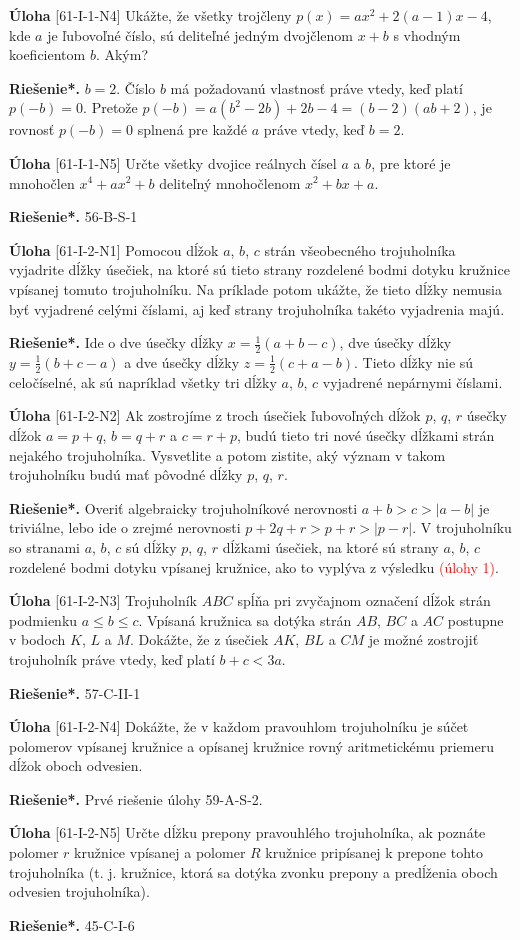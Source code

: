 \documentclass{article}
\newcommand{\rieh}{\textbf{Riešenie*.} }
\newcommand\todo[1]{\noindent\textcolor{red}{(#1)}}
\newcommand{\problem}[4]{
  \begin{tcolorbox}[breakable,notitle,boxrule=0pt,colback=light-gray,colframe=light-gray]
    \textbf{Úloha}
    [#1] #3
  \end{tcolorbox}
  \noindent#4
}
\begin{document}
\problem{61-I-1-N4}{}{
Ukážte, že všetky trojčleny $p(x) = ax^2+ 2(a - 1)x - 4$, kde $a$ je ľubovoľné číslo, sú deliteľné jedným dvojčlenom $x+b$ s vhodným koeficientom $b$. Akým?
}{
\rieh $b = 2$. Číslo $b$ má požadovanú vlastnosť práve vtedy, keď platí $p(-b) = 0$. Pretože $p(-b) = a(b^2 - 2b)+ 2b - 4 = (b - 2)(ab + 2)$, je rovnosť $p(-b) = 0$ splnená pre každé $a$ práve vtedy, keď $b = 2$.
}


\problem{61-I-1-N5}{}{
Určte všetky dvojice reálnych čísel $a$ a $b$, pre ktoré je mnohočlen $x^4+ ax^2+ b$ deliteľný
mnohočlenom $x^2+ bx + a$.
}{
\rieh 56-B-S-1
}


\problem{61-I-2-N1}{}{
Pomocou dĺžok $a$, $b$, $c$ strán všeobecného trojuholníka vyjadrite dĺžky úsečiek, na ktoré sú tieto strany rozdelené bodmi dotyku kružnice vpísanej tomuto trojuholníku. Na príklade potom ukážte, že tieto dĺžky nemusia byť vyjadrené celými číslami, aj keď strany trojuholníka takéto vyjadrenia majú.
}{
\rieh Ide o dve úsečky dĺžky $x =\frac{1}{2}(a + b - c)$, dve úsečky dĺžky $y =\frac{1}{2}(b + c - a)$ a dve úsečky dĺžky $z =\frac{1}{2}(c + a - b)$. Tieto dĺžky nie sú celočíselné, ak sú napríklad všetky tri dĺžky $a$, $b$, $c$ vyjadrené nepárnymi číslami.
}


\problem{61-I-2-N2}{}{
Ak zostrojíme z troch úsečiek ľubovoľných dĺžok $p$, $q$, $r$ úsečky dĺžok $a = p+q$, $b = q+r$ a $c = r + p$, budú tieto tri nové úsečky dĺžkami strán nejakého trojuholníka. Vysvetlite a potom zistite, aký význam v takom trojuholníku budú mať pôvodné dĺžky $p$, $q$, $r$.
}{
\rieh Overiť algebraicky trojuholníkové nerovnosti $a + b > c > |a - b|$ je triviálne, lebo ide o zrejmé nerovnosti $p + 2q + r > p + r > |p - r|$. V trojuholníku so stranami $a$, $b$, $c$ sú dĺžky $p$, $q$, $r$ dĺžkami úsečiek, na ktoré sú strany $a$, $b$, $c$ rozdelené bodmi dotyku vpísanej kružnice, ako to vyplýva z výsledku \todo{úlohy 1}.
}


\problem{61-I-2-N3}{}{
Trojuholník $ABC$ spĺňa pri zvyčajnom označení dĺžok strán podmienku $a \leq  b \leq c$. Vpísaná kružnica sa dotýka strán $AB$, $BC$ a $AC$ postupne v bodoch $K$, $L$ a $M$. Dokážte, že z úsečiek $AK$, $BL$ a $CM$ je možné zostrojiť trojuholník práve vtedy, keď platí $b + c < 3a$.
}{
\rieh 57-C-II-1
}

\problem{61-I-2-N4}{}{
Dokážte, že v každom pravouhlom trojuholníku je súčet polomerov vpísanej kružnice a opísanej kružnice rovný aritmetickému priemeru dĺžok oboch odvesien.
}{
\rieh Prvé riešenie úlohy 59-A-S-2.
}

\problem{61-I-2-N5}{}{
Určte dĺžku prepony pravouhlého trojuholníka, ak poznáte polomer $r$ kružnice vpísanej a polomer $R$ kružnice pripísanej k prepone tohto trojuholníka (t. j. kružnice, ktorá sa dotýka zvonku prepony a predĺženia oboch odvesien trojuholníka).
}{
\rieh 45-C-I-6
}
\end{document}

